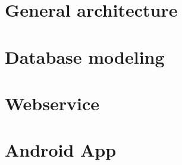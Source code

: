 


\section{General architecture}\label{sec:GArc}


\section{Database modeling}


\section{Webservice}\label{sec:Webs}


\section{Android App}\label{sec:Andr}


